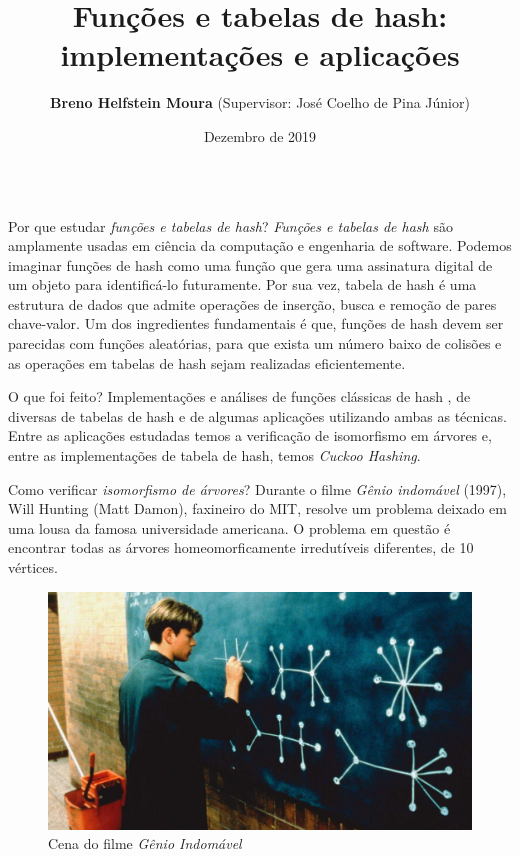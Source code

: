 \documentclass{beamer}
\title{\color{purple} \Huge \textbf{Funções e tabelas de hash: implementações e aplicações}}
\author{{\Large \textbf{Breno Helfstein Moura}} {\small (Supervisor: José Coelho de Pina Júnior)}}
\institute{\small Trabalho de Formatura Supervisionado do Bacharelado em Ciência da Computação no Instituto de Matemática e Estatística da Universidade de São Paulo (IME-USP)}
\date{Dezembro de 2019}
\begin{document}
\begin{frame}
  
\begin{columns}[t]
\begin{column}{.5\textwidth}
  \begin{block}{Por que estudar \emph{funções e tabelas de hash}?}
    \emph{Funções e tabelas de hash} são amplamente usadas em ciência da computação e engenharia de software. Podemos imaginar funções de hash como uma função que gera uma assinatura digital de um objeto para identificá-lo futuramente. Por sua vez, tabela de hash é uma estrutura de dados que admite operações de inserção, busca e remoção de pares chave-valor. Um dos ingredientes fundamentais é que, funções de hash devem ser parecidas com funções aleatórias, para que exista um número baixo de colisões e as operações em tabelas de hash sejam realizadas eficientemente. 
  \end{block}

  \begin{block}{O que foi feito?}
    Implementações e análises de funções clássicas de hash \cite{TAOCP3}, de diversas de tabelas de hash  e de algumas aplicações utilizando ambas as técnicas.
     Entre as aplicações estudadas temos a verificação de isomorfismo em árvores e, entre as implementações de tabela de hash, temos \textit{Cuckoo Hashing}. 
  \end{block}

  \begin{block}{Como verificar \emph{isomorfismo de árvores}?}
    Durante o filme \textit{Gênio indomável} (1997), Will Hunting (Matt Damon), faxineiro do MIT, resolve um problema deixado em uma lousa da famosa universidade americana. O problema em questão é encontrar todas as árvores homeomorficamente irredutíveis diferentes, de 10 vértices.
    \begin{figure}
      \includegraphics[width=.9\linewidth]{figuras/good-will-hunting.jpg}
      \caption{Cena do filme \textit{Gênio Indomável}}
    \end{figure}


\end{block}
\end{column}
\end{columns}
\end{frame}
\end{document}
